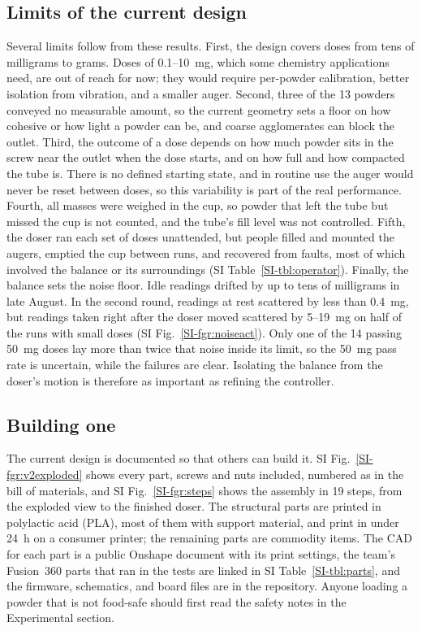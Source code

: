 \documentclass[twoside,twocolumn,9pt]{article}
\newcommand{\siref}[1]{\ref*{SI-#1}}
\begin{document}
\subsection{Limits of the current design}
\label{sec:limits}

Several limits follow from these results. First, the design covers doses from tens of milligrams to grams. Doses of 0.1--10~mg, which some chemistry applications need, are out of reach for now; they would require per-powder calibration, better isolation from vibration, and a smaller auger. Second, three of the 13 powders conveyed no measurable amount, so the current geometry sets a floor on how cohesive or how light a powder can be, and coarse agglomerates can block the outlet. Third, the outcome of a dose depends on how much powder sits in the screw near the outlet when the dose starts, and on how full and how compacted the tube is. There is no defined starting state, and in routine use the auger would never be reset between doses, so this variability is part of the real performance. Fourth, all masses were weighed in the cup, so powder that left the tube but missed the cup is not counted, and the tube's fill level was not controlled. Fifth, the doser ran each set of doses unattended, but people filled and mounted the augers, emptied the cup between runs, and recovered from faults, most of which involved the balance or its surroundings (SI Table~\siref{tbl:operator}). Finally, the balance sets the noise floor. Idle readings drifted by up to tens of milligrams in late August. In the second round, readings at rest scattered by less than 0.4~mg, but readings taken right after the doser moved scattered by 5--19~mg on half of the runs with small doses (SI Fig.~\siref{fgr:noiseact}). Only one of the 14 passing 50~mg doses lay more than twice that noise inside its limit, so the 50~mg pass rate is uncertain, while the failures are clear. Isolating the balance from the doser's motion is therefore as important as refining the controller.

\subsection{Building one}
\label{sec:build}

The current design is documented so that others can build it. SI Fig.~\siref{fgr:v2exploded} shows every part, screws and nuts included, numbered as in the bill of materials, and SI Fig.~\siref{fgr:steps} shows the assembly in 19 steps, from the exploded view to the finished doser. The structural parts are printed in polylactic acid (PLA), most of them with support material, and print in under 24~h on a consumer printer; the remaining parts are commodity items. The CAD for each part is a public Onshape document with its print settings, the team's Fusion~360 parts that ran in the tests are linked in SI Table~\siref{tbl:parts}, and the firmware, schematics, and board files are in the repository. Anyone loading a powder that is not food-safe should first read the safety notes in the Experimental section.
\end{document}
